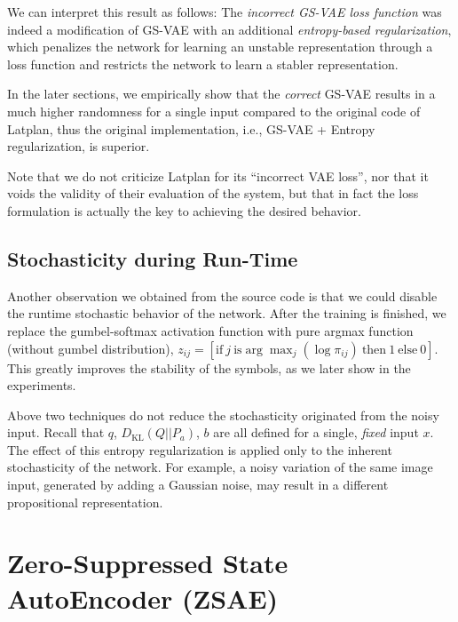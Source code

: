We can interpret this result as follows:
The \emph{incorrect GS-VAE loss function}
was indeed a modification of GS-VAE with an additional \emph{entropy-based regularization},
which penalizes the network for learning an unstable representation
through a loss function and restricts the network to learn a stabler representation.

In the later sections, we empirically show that the \emph{correct} GS-VAE results in
a much higher randomness for a single input compared to the original code of Latplan,
thus the original implementation, i.e., GS-VAE + Entropy regularization, is superior.

Note that we do not criticize Latplan for its ``incorrect VAE loss'',
nor that it voids the validity of their evaluation of the system,
but that in fact the loss formulation is actually the key to achieving the desired behavior.

\subsection{Stochasticity during Run-Time}

Another observation we obtained from the source code is that we could
disable the runtime stochastic behavior of the network.
After the training is finished, we replace the gumbel-softmax activation function with
pure argmax function (without gumbel distribution),
$z_{ij} = [ \text{if}\ j\ \text{is} \arg \max_j (\log \pi_{ij})\ \text{then}\ 1\ \text{else}\ 0 ]$.
This greatly improves the stability of the symbols, as we later show in the experiments.

Above two techniques do not reduce the stochasticity originated from the noisy input.
Recall that $q$, $D_{\text{KL}}(Q||P_a)$, $b$ are all defined for a single, \emph{fixed} input $x$.
The effect of this entropy regularization is applied only to the inherent stochasticity of the network.
% 
For example, a noisy variation of the same image input, generated by
adding a Gaussian noise, may result in a different
propositional representation.

\section{Zero-Suppressed State AutoEncoder (ZSAE)}
\label{zsae}


